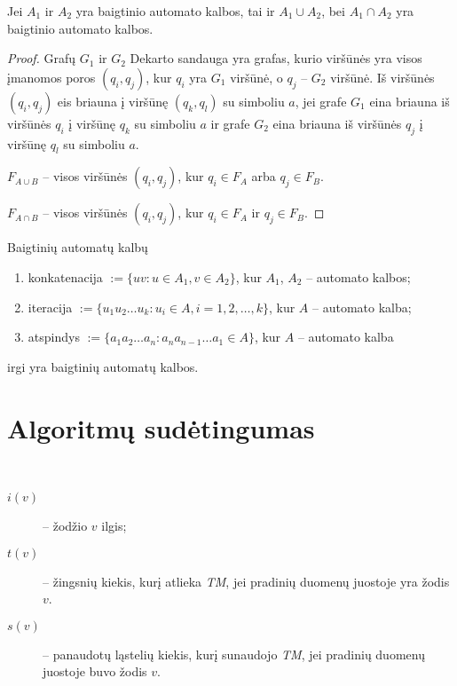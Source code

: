 \begin{prop}
  Jei $A_1$ ir $A_2$ yra baigtinio automato kalbos, tai ir 
  $A_1 \cup A_2$, bei $A_1 \cap A_2$ yra baigtinio automato kalbos.

  \begin{proof}
    Grafų $G_1$ ir $G_2$ Dekarto sandauga yra grafas, kurio viršūnės yra 
    visos įmanomos poros $(q_i,q_j)$, kur $q_i$ yra $G_1$ viršūnė, o 
    $q_j$ – $G_2$ viršūnė. Iš viršūnės $(q_i,q_j)$ eis briauna į 
    viršūnę $(q_k,q_l)$ su simboliu $a$, jei grafe $G_1$ eina briauna iš
    viršūnės $q_i$ į viršūnę $q_k$ su simboliu $a$ ir grafe $G_2$ eina
    briauna iš viršūnės $q_j$ į viršūnę $q_l$ su simboliu $a$.
    
    $F_{A \cup B}$ – visos viršūnės $(q_i,q_j)$, kur $q_i \in F_{A}$
    arba $q_j \in F_{B}$.

    $F_{A \cap B}$ – visos viršūnės $(q_i,q_j)$, kur $q_i \in F_{A}$
    ir $q_j \in F_{B}$.
  \end{proof}
\end{prop}

\begin{prop}
  Baigtinių automatų kalbų
  \begin{enumerate}
    \item konkatenacija $:= \{ uv : u \in A_1, v \in A_2 \}$, kur 
      $A_1$, $A_2$ – automato kalbos;
    \item iteracija $:=\{u_1 u_2 \dots u_k : u_i \in A, i=1,2,\dotsc,k\}$,
      kur $A$ – automato kalba;
    \item atspindys $:=\{a_1 a_2 \dots a_n : a_n a_{n-1} \dots a_1 %
      \in A \}$, kur $A$ – automato kalba
  \end{enumerate}
    irgi yra baigtinių automatų kalbos.
\end{prop}

\section{Algoritmų sudėtingumas}

\begin{notation}
  \hfill \\
  \begin{description}
    \item[$i(v)$] – žodžio $v$ ilgis;
    \item[$t(v)$] – žingsnių kiekis, kurį atlieka \emph{TM}, jei 
      pradinių duomenų juostoje yra žodis $v$.
    \item[$s(v)$] – panaudotų ląstelių kiekis, kurį sunaudojo \emph{TM},
      jei pradinių duomenų juostoje buvo žodis $v$.
  \end{description}
\end{notation}


